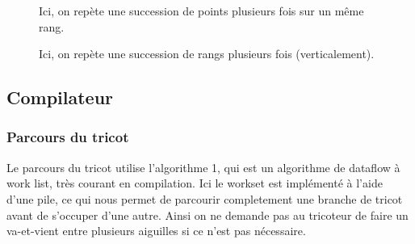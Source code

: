 \documentclass{article}
\begin{document}
\begin{figure}[!ht]
	\centering
	\caption{Ici, on repète une succession de points plusieurs fois sur un même rang.}
	\label{instruction1}
\end{figure}

\begin{figure}[!ht]
	\centering
	\caption{Ici, on repète une succession de rangs plusieurs fois (verticalement).}
	\label{instruction2}
\end{figure}


\subsection{Compilateur}

\subsubsection{Parcours du tricot}

Le parcours du tricot utilise l'algorithme 1, qui est un algorithme de
dataflow à work list, très courant en compilation. Ici le workset est
implémenté à l'aide d'une pile, ce qui nous permet de parcourir
completement une branche de tricot avant de s'occuper d'une
autre. Ainsi on ne demande pas au tricoteur de faire un va-et-vient
entre plusieurs aiguilles si ce n'est pas nécessaire.
\end{document}

